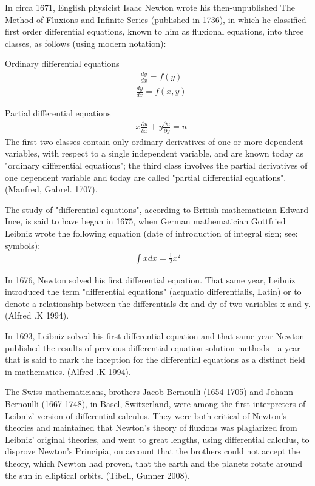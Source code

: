 \documentclass[12pt]{report}
\begin{document}
\par In circa 1671, English physicist Isaac Newton wrote his then-unpublished The Method of Fluxions and Infinite Series (published in 1736), in which he classified first order differential equations, known to him as fluxional equations, into three classes, as follows (using modern notation):
\par Ordinary differential equations
\begin{align*}
&\frac{dy}{dx}=f(y)\tag{Class 1}
\end{align*}
\begin{align*}
&\frac{dy}{dx}=f(x,y)\tag{Class 2}
\end{align*}
\par Partial differential equations
\begin{align*}
& x \frac{\partial u}{\partial x}+ y\frac{\partial u}{\partial y}=u\tag{Class 3}
\end{align*}
The first two classes contain only ordinary derivatives of one or more dependent variables, with respect to a single independent variable, and are known today as "ordinary differential equations"; the third class involves the partial derivatives of one dependent variable and today are called "partial differential equations". (Manfred, Gabrel. 1707).

\par The study of "differential equations", according to British mathematician Edward Ince, is said to have began in 1675, when German mathematician Gottfried Leibniz wrote the following equation (date of introduction of integral sign; see: symbols):
\begin{align*}
\int x dx = \frac {1}{2}x^2
\end{align*}
\par In 1676, Newton solved his first differential equation. That same year, Leibniz introduced the term "differential equations" (aequatio differentialis, Latin) or to denote a relationship between the differentials dx and dy of two variables x and y. (Alfred .K 1994).

In 1693, Leibniz solved his first differential equation and that same year Newton published the results of previous differential equation solution methods—a year that is said to mark the inception for the differential equations as a distinct field in mathematics. (Alfred .K 1994).

\par The Swiss mathematicians, brothers Jacob Bernoulli (1654-1705) and Johann Bernoulli (1667-1748), in Basel, Switzerland, were among the first interpreters of Leibniz' version of differential calculus. They were both critical of Newton's theories and maintained that Newton’s theory of fluxions was plagiarized from Leibniz' original theories, and went to great lengths, using differential calculus, to disprove Newton’s Principia, on account that the brothers could not accept the theory, which Newton had proven, that the earth and the planets rotate around the sun in elliptical orbits. (Tibell, Gunner 2008).\\
\end{document}
